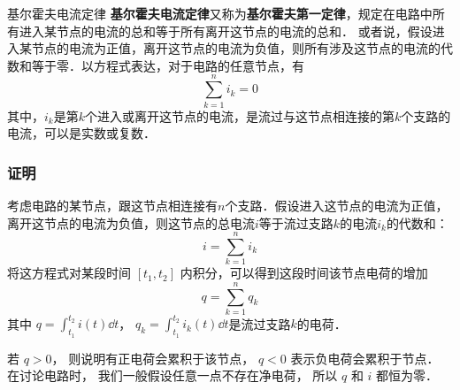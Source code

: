 

\begin{theorem}{基尔霍夫电流定律}
\textbf{基尔霍夫电流定律}又称为\textbf{基尔霍夫第一定律}，规定在电路中所有进入某节点的电流的总和等于所有离开这节点的电流的总和． 或者说，假设进入某节点的电流为正值，离开这节点的电流为负值，则所有涉及这节点的电流的代数和等于零．以方程式表达，对于电路的任意节点，有
\begin{equation}
\sum_{k=1}^n i_k =0
\end{equation}
其中，$i_k$是第$k$个进入或离开这节点的电流，是流过与这节点相连接的第$k$个支路的电流，可以是实数或复数．
\end{theorem}

\subsubsection{证明}
考虑电路的某节点，跟这节点相连接有$n$个支路．假设进入这节点的电流为正值，离开这节点的电流为负值，则这节点的总电流$i$等于流过支路$k$的电流$i_k$的代数和：
\begin{equation}
i=\sum_{k=1}^n i_k
\end{equation}
将这方程式对某段时间 $[t_1, t_2]$ 内积分，可以得到这段时间该节点电荷的增加
\begin{equation}
q=\sum_{k=1}^n q_k
\end{equation}
其中 $q = \int_{t_1}^{t_2} i(t) \dd{t}$， $q_k=\int_{t_1}^{t_2} i_k(t) \dd{t}$是流过支路$k$的电荷．

若 $q>0$， 则说明有正电荷会累积于该节点， $q < 0$ 表示负电荷会累积于节点． 在讨论电路时， 我们一般假设任意一点不存在净电荷， 所以 $q$ 和 $i$ 都恒为零．

